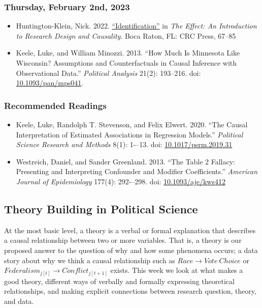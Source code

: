 \documentclass[12pt,]{article}
\begin{document}
\hypertarget{thursday-february-2nd-2023}{%
\subsubsection{Thursday, February 2nd,
2023}\label{thursday-february-2nd-2023}}

\begin{itemize}
\item
  Huntington-Klein, Nick. 2022.
  \href{https://theeffectbook.net/ch-Identification.html}{``Identification''}
  in \emph{The Effect: An Introduction to Research Design and
  Causality}. Boca Raton, FL: CRC Press, 67--85
\item
  Keele, Luke, and William Minozzi. 2013. ``How Much Is Minnesota Like
  Wisconsin? Assumptions and Counterfactuals in Causal Inference with
  Observational Data.'' \emph{Political Analysis} 21(2): 193--216. doi:
  \href{https://doi.org/10.1093/pan/mps041}{10.1093/pan/mps041}.
\end{itemize}

\hypertarget{recommended-readings-1}{%
\subsubsection{Recommended Readings}\label{recommended-readings-1}}

\begin{itemize}
\item
  Keele, Luke, Randolph T. Stevenson, and Felix Elwert. 2020. ``The
  Causal Interpretation of Estimated Associations in Regression
  Models.'' \emph{Political Science Research and Methods} 8(1):
  1-\/--13. doi:
  \href{https://doi.org/10.1017/psrm.2019.31}{10.1017/psrm.2019.31}
\item
  Westreich, Daniel, and Sander Greenland. 2013. ``The Table 2 Fallacy:
  Presenting and Interpreting Confounder and Modifier Coefficients.''
  \emph{American Journal of Epidemiology} 177(4): 292-\/--298. doi:
  \href{https://doi.org/10.1093/aje/kws412}{10.1093/aje/kws412}
\end{itemize}

\hypertarget{theory-building-in-political-science}{%
\subsection{Theory Building in Political
Science}\label{theory-building-in-political-science}}

\noindent At the most basic level, a theory is a verbal or formal
explanation that describes a causal relationship between two or more
variables. That is, a theory is our proposed answer to the question of
why and how some phenomena occurs; a data story about why we think a
causal relationship such as \(Race \longrightarrow Vote~Choice\) or
\(Federalism_{j[t]} \longrightarrow Conflict_{j[t+1]}\) exists. This
week we look at what makes a good theory, different ways of verbally and
formally expressing theoretical relationships, and making explicit
connections between research question, theory, and data.
\end{document}
